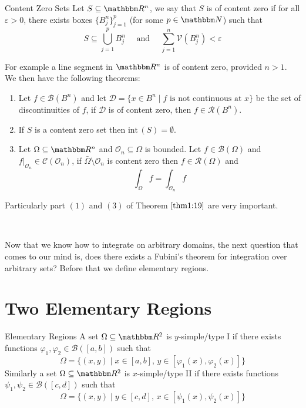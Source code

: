 \documentclass[../Analysis-3.tex]{subfiles}
\begin{document}
\begin{Def}{Content Zero Sets}{}
    Let $S \subseteq \R^n$, we say that $S$ is of content zero if for all $\varepsilon > 0$, there exists boxes $\{ B_j^n \}_{j=1}^p$ (for some $p \in \N$) such that
    \[
        S \subseteq \bigcup_{j=1}^p B_j^n \quad \mbox{ and } \quad \sum_{j=1}^n \mathcal{V}(B^n_j) < \varepsilon
    \]
\end{Def}

For example a line segment in $\R^n$ is of content zero, provided $n > 1$. We then have the following theorems:

\begin{Thm}{}{}\label{thm1:19}
    \begin{enumerate}
        \item Let $f \in \mathscr{B}(B^n)$ and let $\mathcal{D} = \{ x \in B^n \mid f \mbox{ is not continuous at } x \}$ be the set of discontinuities of $f$, if $\mathcal{D}$ is of content zero, then $f \in \mathscr{R}(B^n)$.

        \item If $S$ is a content zero set then $\mathrm{int}\,(S) = \emptyset$.

        \item Let $\Omega \subseteq \R^n$ and $\mathcal{O}_n \subseteq \Omega$ is bounded. Let $f \in \mathscr{B}(\Omega)$ and $f\vert_{\mathcal{O}_n} \in \mathscr{C}(\mathcal{O}_n)$, if $\bar{\Omega}\setminus \mathcal{O}_n$ is content zero then $f \in \mathscr{R}(\Omega)$ and
              \[
                  \int_{\Omega} f = \int_{\mathcal{O}_n} f
              \]
    \end{enumerate}
\end{Thm}
Particularly part $(1)$ and $(3)$ of Theorem $\ref{thm1:19}$ are very important.

\

Now that we know how to integrate on arbitrary domains, the next question that comes to our mind is, does there exists a Fubini's theorem for integration over arbitrary sets? Before that we define elementary regions.

\section{Two Elementary Regions}

\begin{Def}{Elementary Regions}{}
    A set $\Omega \subseteq \R^2$ is $y$-simple/type I if there exists functions $\varphi_1, \varphi_2 \in \mathscr{B}([a,b])$ such that
    \[
        \Omega = \{ (x,y) \mid x \in [a,b], \, y \in [\varphi_1(x), \varphi_2(x)] \}
    \]
    Similarly a set $\Omega \subseteq \R^2$ is $x$-simple/type II if there exists functions $\psi_1, \psi_2 \in \mathscr{B}([c,d])$ such that
    \[
        \Omega = \{ (x,y) \mid y \in [c,d], \, x \in [ \psi_1(x), \psi_2(x) ] \}
    \]
\end{Def}
\end{document}
